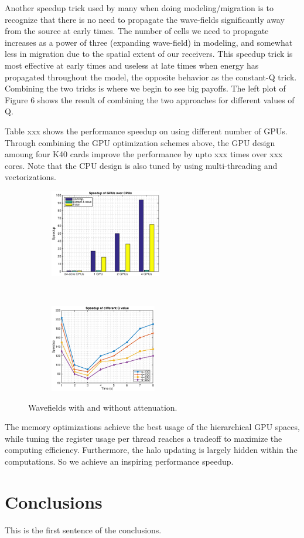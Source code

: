 \documentclass{paris17}
\begin{document}
Another speedup trick used by many when doing modeling/migration is to recognize that there is no need to propagate the wave-fields significantly away from the source at early times. The number of cells we need to propagate increases as a power of three (expanding wave-field) in modeling, and somewhat less in migration due to the spatial extent of our receivers. This speedup trick is most effective at early times and useless at late times when energy has propagated throughout the model, the opposite behavior as the constant-Q trick. Combining the two tricks is where we begin to see big payoffs. The left plot of Figure 6 shows the result of combining the two approaches for different values of Q.

Table xxx shows the performance speedup on using different number of GPUs. Through combining the GPU optimization schemes above, the GPU design amoung four K40 cards improve the performance by upto xxx times over xxx cores. Note that the CPU design is also tuned by using multi-threading and vectorizations.
\begin{figure}[h]
    \centering
    \begin{subfigure}[b]{0.4\textwidth}
        \centering
        \includegraphics[height=1.5in]{./fig/speedup.eps}
    \end{subfigure}%
    ~
    \begin{subfigure}[b]{0.4\textwidth}
        \centering
        \includegraphics[height=1.5in]{./fig/speedup_q.eps}
    \end{subfigure}
    \caption{Wavefields with and without attenuation.}
\end{figure}


The memory optimizations achieve the best usage of the hierarchical GPU spaces, while tuning the register usage per thread reaches a tradeoff to maximize the computing efficiency. Furthermore, the halo updating is largely hidden within the computations. So we achieve an inspiring performance speedup.

\section{Conclusions}

This is the first sentence of the conclusions.



\end{document}
